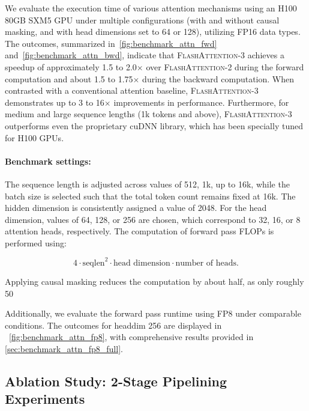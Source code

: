 \begin{enumerate}
We evaluate the execution time of various attention mechanisms using an H100 80GB SXM5 GPU under multiple configurations (with and without causal masking, and with head dimensions set to 64 or 128), utilizing FP16 data types. The outcomes, summarized in~\cref{fig:benchmark_attn_fwd} and~\cref{fig:benchmark_attn_bwd}, indicate that \textsc{FlashAttention-3} achieves a speedup of approximately 1.5 to 2.0$\times$ over \textsc{FlashAttention-2} during the forward computation and about 1.5 to 1.75$\times$ during the backward computation. When contrasted with a conventional attention baseline, \textsc{FlashAttention-3} demonstrates up to 3 to 16$\times$ improvements in performance. Furthermore, for medium and large sequence lengths (1k tokens and above), \textsc{FlashAttention-3} outperforms even the proprietary cuDNN library, which has been specially tuned for H100 GPUs.

\paragraph{Benchmark settings:} The sequence length is adjusted across values of 512, 1k, up to 16k, while the batch size is selected such that the total token count remains fixed at 16k. The hidden dimension is consistently assigned a value of 2048. For the head dimension, values of 64, 128, or 256 are chosen, which correspond to 32, 16, or 8 attention heads, respectively. The computation of forward pass FLOPs is performed using:

\begin{equation*}
  4 \cdot \text{seqlen}^2 \cdot \text{head dimension} \cdot \text{number of heads}.
\end{equation*}

Applying causal masking reduces the computation by about half, as only roughly 50%

Additionally, we evaluate the forward pass runtime using FP8 under comparable conditions. The outcomes for headdim 256 are displayed in ~\cref{fig:benchmark_attn_fp8}, with comprehensive results provided in \cref{sec:benchmark_attn_fp8_full}.

\subsection{Ablation Study: 2-Stage Pipelining Experiments}
\label{sec:2-stage-pipelining-experiments}


\end{enumerate}
